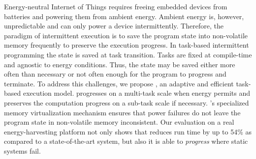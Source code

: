 
Energy-neutral Internet of Things requires freeing embedded devices from batteries and powering them from ambient energy. Ambient energy is, however, unpredictable and can only power a device intermittently. Therefore, the paradigm of intermittent execution is to save the program state into non-volatile memory frequently to preserve the execution progress. In task-based intermittent programming the state is saved at task transition. Tasks are fixed at compile-time and agnostic to energy conditions. Thus, the state may be saved either more often than necessary or not often enough for the program to progress and terminate. To address this challenges, we propose \sys, an adaptive and efficient task-based execution model. \sys progresses on a multi-task scale when energy permits and preserves the computation progress on a sub-task scale if necessary. \sys's specialized memory virtualization mechanism ensures that power failures do not leave the program state in non-volatile memory inconsistent. Our evaluation on a real energy-harvesting platform not only shows that \sys reduces run time by up to 54\% as compared to a state-of-the-art system, but also it is able to \emph{progress} where static systems fail.